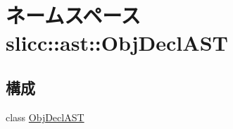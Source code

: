 \hypertarget{namespaceslicc_1_1ast_1_1ObjDeclAST}{
\section{ネームスペース slicc::ast::ObjDeclAST}
\label{namespaceslicc_1_1ast_1_1ObjDeclAST}
}
\subsection*{構成}
\begin{DoxyCompactItemize}
\item 
class \hyperlink{classslicc_1_1ast_1_1ObjDeclAST_1_1ObjDeclAST}{ObjDeclAST}
\end{DoxyCompactItemize}
